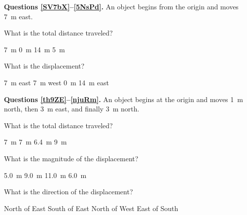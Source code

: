 \documentclass[]{exam}
\begin{document}
\begin{questions}  

\begin{EnvUplevel}
    \textbf{Questions \ref{SV7bX}--\ref{5NsPd}.} An object begins from the origin and moves \SI{7}{m} east.
\end{EnvUplevel}

\question \label{SV7bX}
What is the total distance traveled?

\begin{randomizechoices}
    \correctchoice \SI{7}{m}
    \choice \SI{0}{m}
    \choice \SI{14}{m}
    \choice \SI{5}{m}
\end{randomizechoices}

\question \label{5NsPd}
What is the displacement?

\begin{randomizechoices}
    \correctchoice \SI{7}{m} east
    \choice \SI{7}{m} west
    \choice \SI{0}{m}
    \choice \SI{14}{m} east
\end{randomizechoices}

\begin{EnvUplevel}
    \textbf{Questions \ref{th9ZE}--\ref{njuRm}.} An object begins at the origin and moves \SI{1}{m} north, then \SI{3}{m} east, and finally \SI{3}{m} north.
\end{EnvUplevel}


\question \label{th9ZE}
What is the total distance traveled?

\begin{randomizechoices}
    \correctchoice \SI{7}{m}
    \choice \SI{7}{m}
    \choice \SI{6.4}{m}
    \choice \SI{9}{m}
\end{randomizechoices}

\question
What is the magnitude of the displacement?

\begin{randomizechoices}
    \correctchoice \SI{5.0}{m}
    \choice \SI{9.0}{m}
    \choice \SI{11.0}{m}
    \choice \SI{6.0}{m}
\end{randomizechoices}

\question \label{njuRm}
What is the direction of the displacement?

\begin{randomizechoices}
    \correctchoice North of East
    \choice South of East
    \choice North of West
    \choice East of South
\end{randomizechoices}

\end{questions}
\end{document}
